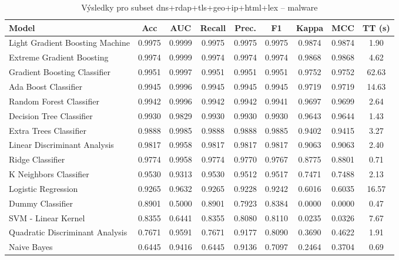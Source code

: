 \begin{table}[H]
  \centering
  \small
  \caption{Výsledky pro subset dns+rdap+tls+geo+ip+html+lex – malware}
  \begin{tabular}{|l|c|c|c|c|c|c|c|c|}
    \hline
    \textbf{Model} & \textbf{Acc} & \textbf{AUC} & \textbf{Recall} & \textbf{Prec.} & \textbf{F1} & \textbf{Kappa} & \textbf{MCC} & \textbf{TT (s)} \\
    \hline
    Light Gradient Boosting Machine & 0.9975 & 0.9999 & 0.9975 & 0.9975 & 0.9975 & 0.9874 & 0.9874 & 1.90 \\
    Extreme Gradient Boosting & 0.9974 & 0.9999 & 0.9974 & 0.9974 & 0.9974 & 0.9868 & 0.9868 & 4.62 \\
    Gradient Boosting Classifier & 0.9951 & 0.9997 & 0.9951 & 0.9951 & 0.9951 & 0.9752 & 0.9752 & 62.63 \\
    Ada Boost Classifier & 0.9945 & 0.9996 & 0.9945 & 0.9945 & 0.9945 & 0.9719 & 0.9719 & 14.63 \\
    Random Forest Classifier & 0.9942 & 0.9996 & 0.9942 & 0.9942 & 0.9941 & 0.9697 & 0.9699 & 2.64 \\
    Decision Tree Classifier & 0.9930 & 0.9829 & 0.9930 & 0.9930 & 0.9930 & 0.9643 & 0.9644 & 1.43 \\
    Extra Trees Classifier & 0.9888 & 0.9985 & 0.9888 & 0.9888 & 0.9885 & 0.9402 & 0.9415 & 3.27 \\
    Linear Discriminant Analysis & 0.9817 & 0.9958 & 0.9817 & 0.9817 & 0.9817 & 0.9063 & 0.9063 & 2.40 \\
    Ridge Classifier & 0.9774 & 0.9958 & 0.9774 & 0.9770 & 0.9767 & 0.8775 & 0.8801 & 0.71 \\
    K Neighbors Classifier & 0.9530 & 0.9313 & 0.9530 & 0.9512 & 0.9517 & 0.7471 & 0.7488 & 2.13 \\
    Logistic Regression & 0.9265 & 0.9632 & 0.9265 & 0.9228 & 0.9242 & 0.6016 & 0.6035 & 16.57 \\
    Dummy Classifier & 0.8901 & 0.5000 & 0.8901 & 0.7923 & 0.8384 & 0.0000 & 0.0000 & 0.47 \\
    SVM - Linear Kernel & 0.8355 & 0.6441 & 0.8355 & 0.8080 & 0.8110 & 0.0235 & 0.0326 & 7.67 \\
    Quadratic Discriminant Analysis & 0.7671 & 0.9591 & 0.7671 & 0.9177 & 0.8090 & 0.3690 & 0.4622 & 1.91 \\
    Naive Bayes & 0.6445 & 0.9416 & 0.6445 & 0.9136 & 0.7097 & 0.2464 & 0.3704 & 0.69 \\
    \hline
  \end{tabular}
\end{table}
\vspace{0.5cm}

